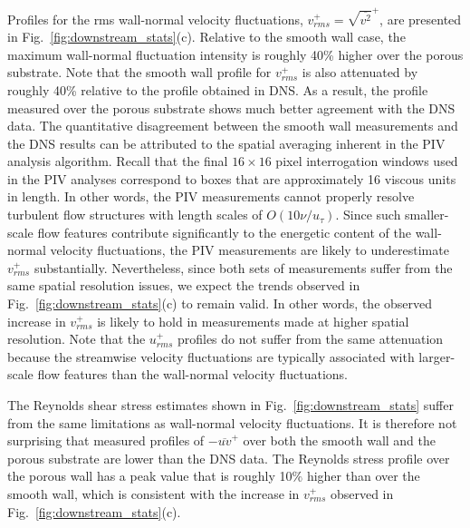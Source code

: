 \documentclass[letterpaper,11pt]{article}
\begin{document}
Profiles for the rms wall-normal velocity fluctuations, $v_{rms}^+ = \sqrt{\overline{v^2}}^+$, are presented in Fig.~\ref{fig:downstream_stats}(c).  Relative to the smooth wall case, the maximum wall-normal fluctuation intensity is roughly 40\% higher over the porous substrate.  Note that the smooth wall profile for $v_{rms}^+$ is also attenuated by roughly 40\% relative to the profile obtained in DNS.  As a result, the profile measured over the porous substrate shows much better agreement with the DNS data.  The quantitative disagreement between the smooth wall measurements and the DNS results can be attributed to the spatial averaging inherent in the PIV analysis algorithm. Recall that the final $16 \times 16$ pixel interrogation windows used in the PIV analyses correspond to boxes that are approximately 16 viscous units in length.  In other words, the PIV measurements cannot properly resolve turbulent flow structures with length scales of $O(10\nu/u_\tau)$.  Since such smaller-scale flow features contribute significantly to the energetic content of the wall-normal velocity fluctuations, the PIV measurements are likely to underestimate $v_{rms}^+$ substantially.  Nevertheless, since both sets of measurements suffer from the same spatial resolution issues, we expect the trends observed in Fig.~\ref{fig:downstream_stats}(c) to remain valid. In other words, the observed increase in $v_{rms}^+$ is likely to hold in measurements made at higher spatial resolution.  Note that the $u_{rms}^+$ profiles do not suffer from the same attenuation because the streamwise velocity fluctuations are typically associated with larger-scale flow features than the wall-normal velocity fluctuations.

The Reynolds shear stress estimates shown in Fig.~\ref{fig:downstream_stats} suffer from the same limitations as wall-normal velocity fluctuations.  It is therefore not surprising that measured profiles of $-\overline{uv}^+$ over both the smooth wall and the porous substrate are lower than the DNS data. The Reynolds stress profile over the porous wall has a peak value that is roughly 10$\%$ higher than over the smooth wall, which is consistent with the increase in $v_{rms}^+$ observed in Fig.~\ref{fig:downstream_stats}(c).
\end{document}
